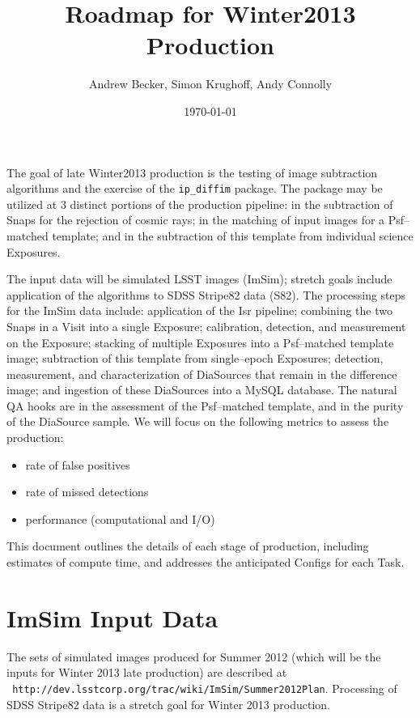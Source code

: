 \documentclass[12pt]{article}
\author{Andrew Becker, Simon Krughoff, Andy Connolly}
\title{Roadmap for Winter2013 Production}
\date{\today}
\begin{document}
\maketitle

The goal of late Winter2013 production is the testing of image
subtraction algorithms and the exercise of the {\tt ip\_diffim}
package.  The package may be utilized at 3 distinct portions of the
production pipeline: in the subtraction of Snaps for the rejection of
cosmic rays; in the matching of input images for a Psf--matched
template; and in the subtraction of this template from individual
science Exposures.

The input data will be simulated LSST images (ImSim); stretch goals
include application of the algorithms to SDSS Stripe82 data (S82).
The processing steps for the ImSim data include: application of the
Isr pipeline; combining the two Snaps in a Visit into a single
Exposure; calibration, detection, and measurement on the Exposure;
stacking of multiple Exposures into a Psf--matched template image;
subtraction of this template from single--epoch Exposures; detection,
measurement, and characterization of DiaSources that remain in the
difference image; and ingestion of these DiaSources into a MySQL
database.  The natural QA hooks are in the assessment of the
Psf--matched template, and in the purity of the DiaSource sample.  We
will focus on the following metrics to assess the production:
\begin{itemize}
\item rate of false positives
\item rate of missed detections
\item performance (computational and I/O)
\end{itemize}
This document outlines the details of each stage of production,
including estimates of compute time, and addresses the anticipated
Configs for each Task.

\clearpage
\tableofcontents
\clearpage


\clearpage 
\section{ImSim Input Data} 

The sets of simulated images produced for Summer 2012 (which will be
the inputs for Winter 2013 late production) are described at \\{\tt
  http://dev.lsstcorp.org/trac/wiki/ImSim/Summer2012Plan}.  Processing
of SDSS Stripe82 data is a stretch goal for Winter 2013 production.
\end{document}
